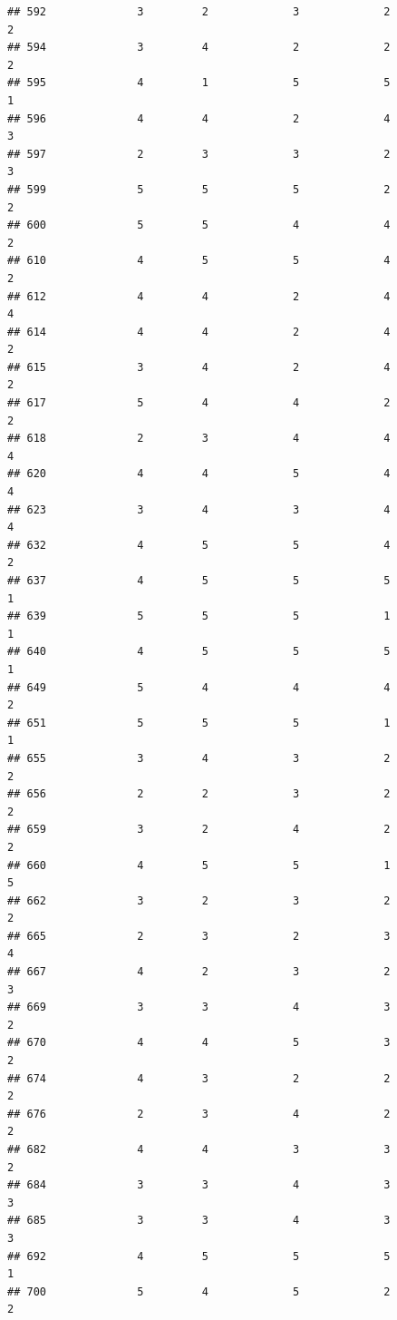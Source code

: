 \documentclass[
]{article}
\begin{document}
\begin{verbatim}
## 592              3         2             3             2           2
## 594              3         4             2             2           2
## 595              4         1             5             5           1
## 596              4         4             2             4           3
## 597              2         3             3             2           3
## 599              5         5             5             2           2
## 600              5         5             4             4           2
## 610              4         5             5             4           2
## 612              4         4             2             4           4
## 614              4         4             2             4           2
## 615              3         4             2             4           2
## 617              5         4             4             2           2
## 618              2         3             4             4           4
## 620              4         4             5             4           4
## 623              3         4             3             4           4
## 632              4         5             5             4           2
## 637              4         5             5             5           1
## 639              5         5             5             1           1
## 640              4         5             5             5           1
## 649              5         4             4             4           2
## 651              5         5             5             1           1
## 655              3         4             3             2           2
## 656              2         2             3             2           2
## 659              3         2             4             2           2
## 660              4         5             5             1           5
## 662              3         2             3             2           2
## 665              2         3             2             3           4
## 667              4         2             3             2           3
## 669              3         3             4             3           2
## 670              4         4             5             3           2
## 674              4         3             2             2           2
## 676              2         3             4             2           2
## 682              4         4             3             3           2
## 684              3         3             4             3           3
## 685              3         3             4             3           3
## 692              4         5             5             5           1
## 700              5         4             5             2           2

\end{verbatim}
\end{document}
